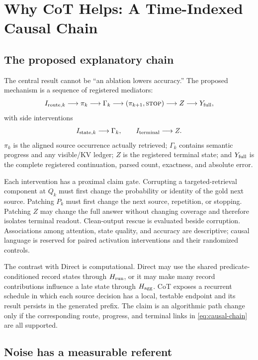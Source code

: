 \section{Why CoT Helps: A Time-Indexed Causal Chain}
\label{sec:synthesis}

\subsection{The proposed explanatory chain}

The central result cannot be ``an ablation lowers accuracy.'' The proposed
mechanism is a sequence of registered mediators:
\begin{equation}
  I_{{\rm route},k}
  \longrightarrow
  \pi_k
  \longrightarrow
  \Gamma_k
  \longrightarrow
  (\pi_{k+1},\textsc{stop})
  \longrightarrow
  Z
  \longrightarrow
  Y_{\rm full},
\label{eq:causal-chain}
\end{equation}
with side interventions
\[
  I_{{\rm state},k}\longrightarrow\Gamma_k,
  \qquad
  I_{\rm terminal}\longrightarrow Z.
\]
\(\pi_k\) is the aligned source occurrence actually retrieved;
\(\Gamma_k\) contains semantic progress and any visible/KV ledger;
\(Z\) is the registered terminal state; and \(Y_{\rm full}\) is the complete
registered continuation, parsed count, exactness, and absolute error.

Each intervention has a proximal claim gate. Corrupting a targeted-retrieval
component at \(Q_k\) must first change the probability or identity of the gold
next source. Patching \(P_k\) must first change the next source, repetition, or
stopping. Patching \(Z\) may change the full answer without changing coverage
and therefore isolates terminal readout. Clean-output rescue is evaluated
beside corruption. Associations among attention, state quality, and accuracy
are descriptive; causal language is reserved for paired activation
interventions and their randomized controls.

The contrast with Direct is computational. Direct may use the shared
predicate-conditioned record states through \(H_{\rm run}\), or it may make
many record contributions influence a late state through \(H_{\rm agg}\).
CoT exposes a recurrent schedule in which each source decision has a local,
testable endpoint and its result persists in the generated prefix. The claim
is an algorithmic path change only if the corresponding route, progress, and
terminal links in \cref{eq:causal-chain} are all supported.

\subsection{Noise has a measurable referent}


